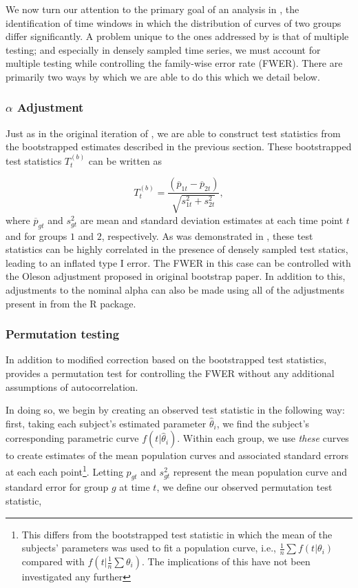 We now turn our attention to the primary goal of an analysis in , the identification of time windows in which the distribution of curves of two groups differ significantly. A problem unique to the ones addressed by  is that of multiple testing; and especially in densely sampled time series, we must account for multiple testing while controlling the family-wise error rate (FWER). There are primarily two ways by which we are able to do this which we detail below.

\subsubsection{$\alpha$ Adjustment}

Just as in the original iteration of , we are able to construct test statistics from the bootstrapped estimates described in the previous section. These bootstrapped test statistics $T_t^{(b)}$ can be written as 

\begin{equation}\label{eq:test_statistic}
T_t^{(b)} = \frac{(\overline{p}_{1t} - \overline{p}_{2t})}{\sqrt{s_{1t}^2 + s_{2t}^2}},
\end{equation}
where $\overline{p}_{gt}$ and $s_{gt}^2$ are mean and standard deviation estimates at each time point $t$ and for groups $1$ and $2$, respectively. As was demonstrated in \cite{oleson2017detecting}, these test statistics can be highly correlated in the presence of densely sampled test statics, leading to an inflated type I error. The FWER in this case can be controlled with the Oleson adjustment proposed in original bootstrap paper. In addition to this, adjustments to the nominal alpha can also be made using all of the adjustments present in  from the R  package.


\subsubsection{Permutation testing}

In addition to modified correction based on the bootstrapped test statistics,  provides a permutation test for controlling the FWER without any additional assumptions of autocorrelation. 

In doing so, we begin by creating an observed test statistic in the following way: first, taking each subject's estimated parameter $\hat{\theta}_i$, we find the subject's corresponding parametric curve $f(t|\hat{\theta}_i)$. Within each group, we use \textit{these} curves to create estimates of the mean population curves and associated standard errors at each each point\footnote{This differs from the bootstrapped test statistic in which the mean of the subjects' parameters was used to fit a population curve, i.e., $\frac1n \sum f(t|\theta_i)$ compared with $f \left( t | \frac1n \sum \theta_i \right)$. The implications of this have not been investigated any further}. Letting $p_{gt}$ and $s_{gt}^2$ represent the mean population curve and standard error for group $g$ at time $t$, we define our observed permutation test statistic, 

